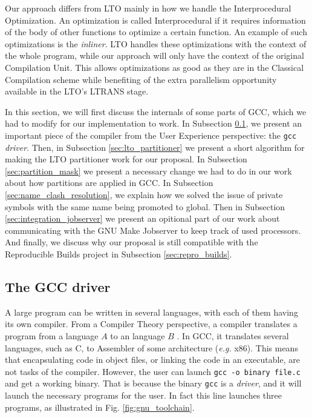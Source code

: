 \documentclass[runningheads]{llncs}
\begin{document}
Our approach differs from LTO mainly in how we handle the Interprocedural
Optimization. An optimization is called Interprocedural if it requires
information of the body of other functions to optimize a certain function.
An example of such optimizations is the \textit{inliner}.
LTO handles these optimizations with the context of the whole program, while
our approach will only have the context of the original Compilation Unit.
This allows optimizations as good as they are in the Classical
Compilation scheme while benefiting of the extra parallelism opportunity
available in the LTO's LTRANS stage.

In this section, we will first discuss the internals of some parts of GCC,
which we had to modify for our implementation to work. In Subsection
\ref{sec:gcc_driver}, we present an important piece of the compiler from the
User Experience perspective: the \texttt{gcc} \textit{driver}. Then, in
Subsection \ref{sec:lto_partitioner} we present a short algorithm for making
the LTO partitioner work for our proposal. In Subsection
\ref{sec:partition_mask} we present a necessary change we had to do in our work
about how partitions are applied in GCC. In
Subsection \ref{sec:name_clash_resolution}, we explain how we solved the issue
of private symbols with the same name being promoted to global.
Then in Subsection \ref{sec:integration_jobserver} we present an opitional part
of our work about communicating with the GNU Make Jobserver to keep track of
used processors. And finally, we discuss why our proposal is still compatible
with the Reproducible Builds project in Subsection \ref{sec:repro_builds}.

\subsection{The GCC driver}\label{sec:gcc_driver}

A large program can be written in several languages, with each of them having
its own compiler. From a Compiler Theory perspective, a compiler
translates a program from a language $A$ to an language $B$
\cite{dragonbook}. In GCC, it translates several languages, such
as C, to Assembler of some architecture (\textit{e.g.} x86). This means that
encapsulating code in object files, or linking the code in an executable, are
not tasks of the compiler. However, the user can launch \texttt{gcc -o binary
file.c} and get a working binary. That is because the binary \texttt{gcc} is
a \textit{driver}, and it will launch the
necessary programs for the user. In fact this line launches three programs,
as illustrated in Fig. \ref{fig:gnu_toolchain}.
\end{document}
